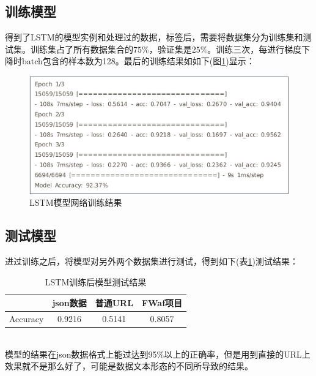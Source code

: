 \subsection{训练模型}
得到了LSTM的模型实例和处理过的数据，标签后，需要将数据集分为训练集和测试集。训练集占了所有数据集合的$75\%$，验证集是$25\%$。训练三次，每进行梯度下降时batch包含的样本数为128。最后的训练结果如如下(图\ref{fig:LSTM_train})显示：
\begin{figure}[!ht]
    \setlength{\abovecaptionskip}{0.cm}
    \setlength{\belowcaptionskip}{-0.cm}
    \centering
     \includegraphics[scale=0.5]{Figs/LSTM_train.png}
    \caption{LSTM模型网络训练结果}
    \label{fig:LSTM_train}
\end{figure}
\subsection{测试模型}
进过训练之后，将模型对另外两个数据集进行测试，得到如下(表\ref{table:lstm_test})测试结果：
\begin{table}[!ht]
    \setlength{\abovecaptionskip}{0.cm}
    \setlength{\belowcaptionskip}{-0.cm}
    \caption{LSTM训练后模型测试结果}
    \centering
    \label{table:lstm_test}    
    \begin{tabular}{|c|c|c|c|}
        \hline
        &json数据&普通URL&FWaf项目\\
        \hline
        Accuracy&0.9216&0.5141&0.8057\\
        \hline
    \end{tabular}
\end{table}
\\\indent{}模型的结果在json数据格式上能过达到95\%以上的正确率，但是用到直接的URL上效果就不是那么好了，可能是数据文本形态的不同所导致的结果。
